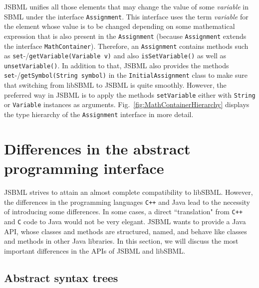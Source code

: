 JSBML
%
unifies all those elements that may
change the value of some \emph{variable} in SBML under the interface
\texttt{Assignment}. This interface uses the term \emph{variable}
for the element whose value is to be changed
depending on some mathematical expression that is also present in the
\texttt{Assignment} (because \texttt{Assignment} extends the interface
\texttt{MathContainer}).
%
Therefore,
an \texttt{Assignment} contains methods such as
\texttt{set}-/\texttt{getVariable(Variable v)} and also \texttt{isSetVariable()}
as well as \texttt{unsetVariable()}. In addition to that, JSBML also provides
the methods \texttt{set}-/\texttt{getSymbol(String symbol)} in the
\texttt{InitialAssignment}
%
class to make sure that switching from libSBML
to JSBML is quite smoothly.
However, the preferred way in JSBML
%
is to apply the methods \texttt{setVariable} either with \texttt{String}
%
or \texttt{Variable} instances as arguments.
Fig.~\vref{fig:MathContainerHierarchy} displays the type hierarchy of the
\texttt{Assignment} interface in more detail.



\section{Differences in the abstract programming interface}

JSBML strives to attain an almost complete compatibility to libSBML. However,
the differences in the programming languages \texttt{C++}
%
and Java\texttrademark{} lead to the necessity of introducing some differences.
In some cases, a direct ``translation" from \texttt{C++} and \texttt{C} code to
%
Java would not be very elegant. JSBML wants to provide a Java API,
%
whose classes and methods are structured, named, and behave like classes and
methods in other Java libraries. In this section, we will discuss the most
important differences in the APIs of JSBML
%
and libSBML.
%


\subsection{Abstract syntax trees}

